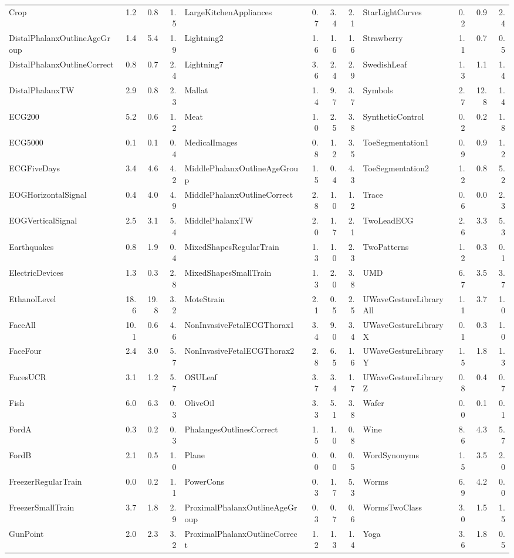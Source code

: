 \begin{table}[!tb]
{\begin{tabular}{@{}lrrrlrrrlrrr@{}}
Crop & 1.2 & 0.8 & 1.5 & LargeKitchenAppliances & 0.7 & 3.4 & 2.1 & StarLightCurves & 0.2 & 0.9 & 2.4 \\
DistalPhalanxOutlineAgeGroup & 1.4 & 5.4 & 1.9 & Lightning2 & 1.6 & 1.6 & 1.6 & Strawberry & 1.1 & 0.7 & 0.5 \\
DistalPhalanxOutlineCorrect & 0.8 & 0.7 & 2.4 & Lightning7 & 3.6 & 2.4 & 2.9 & SwedishLeaf & 1.3 & 1.1 & 1.4 \\
DistalPhalanxTW & 2.9 & 0.8 & 2.3 & Mallat & 1.4 & 9.7 & 3.7 & Symbols & 2.7 & 12.8 & 1.4 \\
ECG200 & 5.2 & 0.6 & 1.2 & Meat & 1.0 & 2.5 & 3.8 & SyntheticControl & 0.2 & 0.2 & 1.8 \\
ECG5000 & 0.1 & 0.1 & 0.4 & MedicalImages & 0.8 & 1.2 & 3.5 & ToeSegmentation1 & 0.9 & 0.9 & 1.2 \\
ECGFiveDays & 3.4 & 4.6 & 4.2 & MiddlePhalanxOutlineAgeGroup & 1.5 & 0.4 & 4.3 & ToeSegmentation2 & 1.2 & 0.8 & 5.2 \\
EOGHorizontalSignal & 0.4 & 4.0 & 4.9 & MiddlePhalanxOutlineCorrect & 2.8 & 1.0 & 1.2 & Trace & 0.6 & 0.0 & 2.3 \\
EOGVerticalSignal & 2.5 & 3.1 & 5.4 & MiddlePhalanxTW & 2.0 & 1.7 & 2.1 & TwoLeadECG & 2.6 & 3.3 & 5.3 \\
Earthquakes & 0.8 & 1.9 & 0.4 & MixedShapesRegularTrain & 1.3 & 1.0 & 2.3 & TwoPatterns & 1.2 & 0.3 & 0.1 \\
ElectricDevices & 1.3 & 0.3 & 2.8 & MixedShapesSmallTrain & 1.3 & 2.0 & 3.8 & UMD & 6.7 & 3.5 & 3.7 \\
EthanolLevel & 18.6 & 19.8 & 3.2 & MoteStrain & 2.1 & 0.5 & 2.5 & UWaveGestureLibraryAll & 1.1 & 3.7 & 1.0 \\
FaceAll & 10.1 & 0.6 & 4.6 & NonInvasiveFetalECGThorax1 & 3.4 & 9.0 & 3.4 & UWaveGestureLibraryX & 0.1 & 0.3 & 1.0 \\
FaceFour & 2.4 & 3.0 & 5.7 & NonInvasiveFetalECGThorax2 & 2.8 & 6.5 & 1.6 & UWaveGestureLibraryY & 1.5 & 1.8 & 1.3 \\
FacesUCR & 3.1 & 1.2 & 5.7 & OSULeaf & 3.7 & 3.4 & 1.7 & UWaveGestureLibraryZ & 0.8 & 0.4 & 0.7 \\
Fish & 6.0 & 6.3 & 0.3 & OliveOil & 3.3 & 5.1 & 3.8 & Wafer & 0.0 & 0.1 & 0.1 \\
FordA & 0.3 & 0.2 & 0.3 & PhalangesOutlinesCorrect & 1.5 & 1.0 & 0.8 & Wine & 8.6 & 4.3 & 5.7 \\
FordB & 2.1 & 0.5 & 1.0 & Plane & 0.0 & 0.0 & 0.5 & WordSynonyms & 1.5 & 3.5 & 2.0 \\
FreezerRegularTrain & 0.0 & 0.2 & 1.1 & PowerCons & 0.3 & 1.7 & 5.3 & Worms & 6.9 & 4.2 & 0.0 \\
FreezerSmallTrain & 3.7 & 1.8 & 2.9 & ProximalPhalanxOutlineAgeGroup & 0.3 & 0.7 & 0.6 & WormsTwoClass & 3.0 & 1.5 & 1.5 \\
GunPoint & 2.0 & 2.3 & 3.2 & ProximalPhalanxOutlineCorrect & 1.2 & 1.3 & 1.4 & Yoga & 3.6 & 1.8 & 0.5 \\
\bottomrule
\end{tabular}%
}
\end{table}


